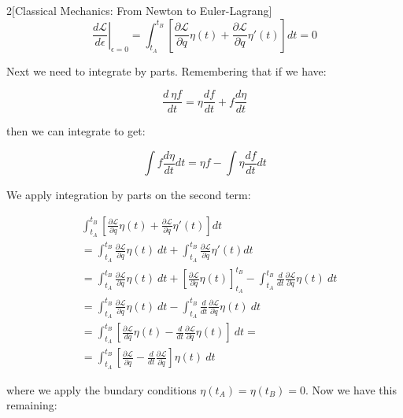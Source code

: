 \documentclass{article}
\begin{document}
\begin{multicols}{2}[Classical Mechanics: From Newton to Euler-Lagrang]
\begin{equation*}
    \left. \frac{d \mathcal{L}}{d \epsilon} \right\vert_{\epsilon = 0} = \int_{t_A}^{t_B} \left[ \frac{\partial \mathcal{L}}{\partial q} \eta(t) + \frac{\partial \mathcal{L}}{\partial \dot{q}} \eta'(t) \right] dt = 0
\end{equation*}

Next we need to integrate by parts. Remembering that if we have:

\begin{equation*}
    \frac{d\ \eta f}{dt} = \eta \frac{df}{dt} + f \frac{d\eta}{dt}
\end{equation*}

then we can integrate to get:

\begin{equation*}
    \int f \frac{d \eta}{dt} dt = \eta f - \int \eta \frac{df}{dt} dt
\end{equation*}

We apply integration by parts on the second term:

\begin{align*}
    & \int_{t_A}^{t_B} \left[ \frac{\partial \mathcal{L}}{\partial q} \eta(t) + \frac{\partial \mathcal{L}}{\partial \dot{q}} \eta'(t) \right] dt \\
    & = \int_{t_A}^{t_B} \frac{\partial \mathcal{L}}{\partial q} \eta(t)\ dt +
        \int_{t_A}^{t_B} \frac{\partial \mathcal{L}}{\partial \dot{q}} \eta'(t) dt \\
    & = \int_{t_A}^{t_B} \frac{\partial \mathcal{L}}{\partial q} \eta(t)\ dt + 
        \left[ \frac{\partial \mathcal{L}}{\partial\dot{q}} \eta(t) \right]_{t_A}^{t_B}
        - \int_{t_A}^{t_B} \frac{d}{dt} \frac{\partial \mathcal{L}}{\partial \dot{q}} \eta(t) \ dt \\
    & = \int_{t_A}^{t_B} \frac{\partial \mathcal{L}}{\partial q} \eta(t)\ dt
    - \int_{t_A}^{t_B}  \frac{d}{dt} \frac{\partial \mathcal{L}}{\partial \dot{q}} \eta(t)\ dt \\
    & = \int_{t_A}^{t_B} \left[ \frac{\partial \mathcal{L}}{dq} \eta(t) - \frac{d}{dt} \frac{\partial \mathcal{L}}{\partial \dot{q}} \eta(t) \right] \ dt = \\
    & = \int_{t_A}^{t_B} \left[ \frac{\partial \mathcal{L}}{\partial q} - \frac{d}{dt} \frac{\partial \mathcal{L}}{\partial\dot{q}} \right] \eta(t) \ dt
\end{align*}

where we apply the bundary conditions $\eta(t_A) = \eta(t_B) = 0$. Now we have this remaining:


\end{multicols}
\end{document}
